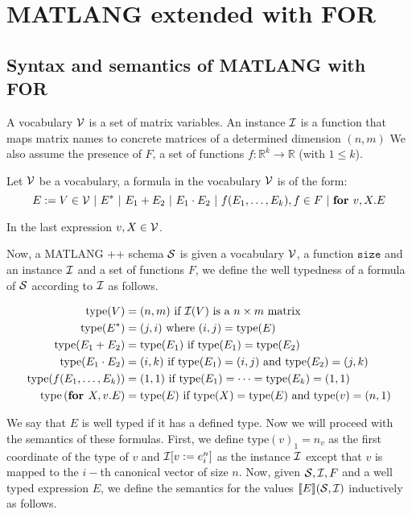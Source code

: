 \section{MATLANG extended with FOR}

\subsection{Syntax and semantics of MATLANG with FOR}

A vocabulary $\mathcal{V}$ is a set of matrix variables. An instance $\mathcal{I}$ is a function that maps matrix names to concrete matrices of a determined dimension $(n,m)$
We also assume the presence of $F$, a set of functions $f:\mathbb{R}^{k}\rightarrow\mathbb{R}$ (with $1\leq k$).

Let $\mathcal{V}$ be a vocabulary, a formula in the vocabulary $\mathcal{V}$ is of the form:
$$
E:= V\in \cV \ |\    E^* \ |\ E_1+E_2 \ |\  E_1\cdot E_2 \ |\  f(E_1,\ldots, E_k), f\in F \ |\  \for v,X. E
$$

In the last expression $v,X\in \mathcal{V}$.

Now, a MATLANG ++ schema $\mathcal{S}$ is given a vocabulary $\mathcal{V}$, a function $\texttt{size}$ and  an instance $\mathcal{I}$ and a set of functions $F$, we define the well typedness of a formula of $\mathcal{S}$ according to $\mathcal{I}$ as follows. 

\begin{align*}
\text{type}(V) &= (n,m) \text{ if } \mathcal{I}(V) \text{ is a } n\times m \text{ matrix } \\
\text{type}(E^*)&=(j,i) \text{ where } (i,j)=\text{type}(E) \\
\text{type}(E_1 + E_2) &= \text{type}(E_1) \text{ if } \text{type}(E_1)=\text{type}(E_2) \\
\text{type}(E_1\cdot E_2)&= (i,k) \text{ if } \text{type}(E_1)=(i,j)\text{ and type}(E_2)=(j,k) \\
\text{type}(f(E_1,\ldots, E_k))&=(1,1) \text{ if } \text{type}(E_1)=\cdots =\text{type}(E_k)=(1,1) \\
\text{type}\left( \textbf{for } X,v. E\right) &= \text{type}(E) \text{ if } \text{type}(X)=\text{type}(E)\text{ and type}(v)=(n,1)
\end{align*}

We say that $E$ is well typed if it has a defined type. Now we will proceed with the semantics of these formulas.
First, we define $\text{type}(v)_1 = n_v$ as the first coordinate of the type of $v$ and $\mathcal{I}[v:= e^n_i]$ as the instance $\mathcal{I}$ except that $v$ is mapped to the $i-$th canonical vector of size $n$.
Now, given $\mathcal{S}, \mathcal{I}, F$ and a well typed expression $E$, we define the semantics for the values $\llbracket E \rrbracket(\mathcal{S},\mathcal{I})$ inductively as follows.

